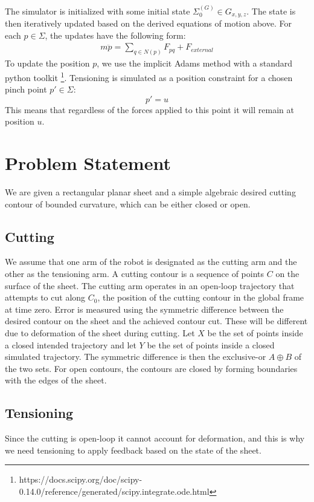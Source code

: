 The simulator is initialized with some initial state $\Sigma^{(G)}_0 \in G_{x,y,z}$. 
The state is then iteratively updated based on the derived equations of motion above.
For each $p \in \Sigma$, the updates have the following form:
\begin{align}
\label{eq:vertex}
m \ddot{p}  = \sum_{q \in N(p)} F_{pq} + F_{external}
\end{align}
To update the position $p$, we use the implicit Adams method with a standard python toolkit \footnote{https://docs.scipy.org/doc/scipy-0.14.0/reference/generated/scipy.integrate.ode.html}. Tensioning is simulated as a position constraint for a chosen pinch point $p' \in \Sigma$:
\[
p' = u
\]
This means that regardless of the forces applied to this point it will remain at position $u$.

\section{Problem Statement}
We are given a rectangular planar sheet and a simple algebraic desired cutting contour of bounded curvature, which can be either closed or open.

\subsection{Cutting}
We assume that one arm of the robot is designated as the cutting arm and the other as the tensioning arm. A cutting contour is a sequence of points $C$ on the surface of the sheet. The cutting arm operates in an open-loop trajectory that attempts to cut along $C_0$, the position of the cutting contour in the global frame at time zero.
Error is measured using the symmetric difference between the desired contour on the sheet and the achieved contour cut. These will be different due to deformation of the sheet during cutting.
Let $X$ be the set of points inside a closed intended trajectory and let $Y$ be the set of points inside a closed simulated trajectory. The symmetric difference is then the exclusive-or $A \oplus B$ of the two sets. For open contours, the contours are closed by forming boundaries with the edges of the sheet.

\subsection{Tensioning}
Since the cutting is open-loop it cannot account for deformation, and this is why we need tensioning to apply feedback based on the state of the sheet.

